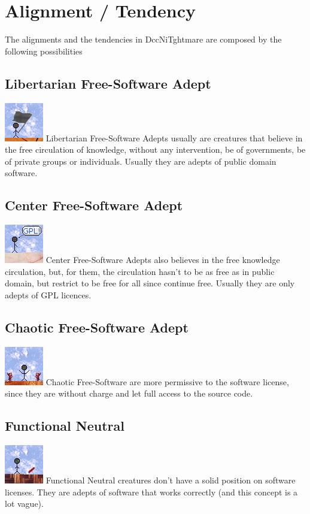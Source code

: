\documentclass[ letterpaper,12pt]{article}
\begin{document}
\section{Alignment / Tendency}

The alignments and the tendencies in DccNiTghtmare are composed by the
following possibilities\\

\subsection{Libertarian Free-Software Adept}
\includegraphics{../data/alignment/Img/libertarian.png} 
Libertarian Free-Software Adepts usually are creatures that believe in the free
circulation of knowledge, without any intervention, be of governments, be of
private groups or individuals. Usually they are adepts of public domain
software.

\subsection{Center Free-Software Adept}
\includegraphics{../data/alignment/Img/gnu.png}
Center Free-Software Adepts also believes in the free knowledge circulation,
but, for them, the circulation hasn't to be as free as in public domain, but
restrict to be free for all since continue free. Usually they are only adepts
of GPL licences.

\subsection{Chaotic Free-Software Adept}
\includegraphics{../data/alignment/Img/beastie.png}
Chaotic Free-Software are more permissive to the software license, since they
are without charge and let full access to the source code.

\subsection{Functional Neutral}
\includegraphics{../data/alignment/Img/canivete.png}
Functional Neutral creatures don't have a solid position on software licenses.
They are adepts of software that works correctly (and this concept is a lot
vague).
\end{document}
